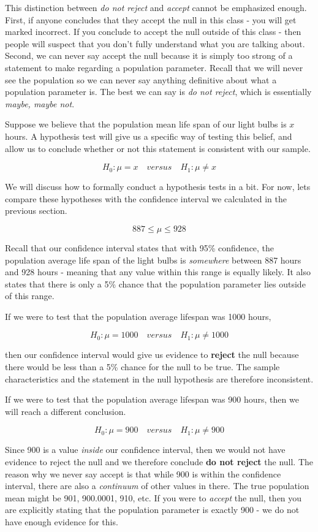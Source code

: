 \documentclass[
]{book}
\begin{document}
This distinction between \emph{do not reject} and \emph{accept} cannot be emphasized enough. First, if anyone concludes that they accept the null in this class - you will get marked incorrect. If you conclude to accept the null outside of this class - then people will suspect that you don't fully understand what you are talking about. Second, we can never say accept the null because it is simply too strong of a statement to make regarding a population parameter. Recall that we will never see the population so we can never say anything definitive about what a population parameter is. The best we can say is \emph{do not reject}, which is essentially \emph{maybe, maybe not}.

Suppose we believe that the population mean life span of our light bulbs is \(x\) hours. A hypothesis test will give us a specific way of testing this belief, and allow us to conclude whether or not this statement is consistent with our sample.

\[H_0:\mu=x \quad versus \quad H_1:\mu\neq x\]

We will discuss how to formally conduct a hypothesis tests in a bit. For now, lets compare these hypotheses with the confidence interval we calculated in the previous section.

\[887 \leq \mu \leq 928\]

Recall that our confidence interval states that with 95\% confidence, the population average life span of the light bulbs is \emph{somewhere} between 887 hours and 928 hours - meaning that any value within this range is equally likely. It also states that there is only a 5\% chance that the population parameter lies outside of this range.

If we were to test that the population average lifespan was 1000 hours,

\[H_0:\mu=1000 \quad versus \quad H_1:\mu\neq 1000\]

then our confidence interval would give us evidence to \textbf{reject} the null because there would be less than a 5\% chance for the null to be true. The sample characteristics and the statement in the null hypothesis are therefore inconsistent.

If we were to test that the population average lifespan was 900 hours, then we will reach a different conclusion.

\[H_0:\mu=900 \quad versus \quad H_1:\mu\neq 900\]

Since 900 is a value \emph{inside} our confidence interval, then we would not have evidence to reject the null and we therefore conclude \textbf{do not reject} the null. The reason why we never say accept is that while 900 is within the confidence interval, there are also a \emph{continuum} of other values in there. The true population mean might be 901, 900.0001, 910, etc. If you were to \emph{accept} the null, then you are explicitly stating that the population parameter is exactly 900 - we do not have enough evidence for this.
\end{document}
